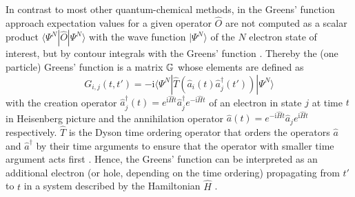 In contrast to most other quantum-chemical methods, in the Greens' function approach expectation values for a given operator $\hat{O}$ are not computed as a scalar product $\langle \Psi^N |\hat{O} | \Psi^N \rangle $ with the wave function $|\Psi^N\rangle$ of the $N$ electron state of interest, but by contour integrals with the Greens' function \cite{bookGF, 1pGFcederbaum}.
Thereby the (one particle) Greens' function is a matrix $\mathbb{G}$ whose elements are defined as
\begin{equation} \label{eq:defGF}
G_{i,j}(t,t')= -\text{i}\langle \Psi^N | \hat{T}\left(\hat{a}_i(t)\hat{a}_j^\dagger(t')\right)|\Psi^N\rangle 
\end{equation}
with the creation operator $\hat{a}^\dagger_j (t)=e^{\text{i}\hat{H}t}\hat{a}^\dagger_j e^{-\text{i}\hat{H}t}$ of an electron in state $j$ at time $t$ in Heisenberg picture and the annihilation operator $\hat{a}(t)=e^{-\text{i}\hat{H}t}\hat{a}_j e^{\text{i}\hat{H}t}$ respectively.
$\hat{T}$ is the Dyson time ordering operator that orders the operators $\hat{a}$ and $\hat{a}^\dagger$ by their time arguments to ensure that the operator with smaller time argument acts first \cite{bookGF}.
Hence, the Greens' function can be interpreted as an additional electron (or hole, depending on the time ordering) propagating from $t'$ to $t$ in a system described by the Hamiltonian $\hat{H}$ \cite{bookGF}.

